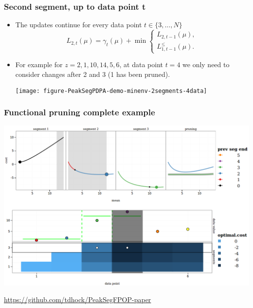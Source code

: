 \documentclass{beamer}
\begin{document}
\begin{frame}
  \frametitle{Second segment, up to data point t}
  \begin{itemize}
  \item The updates continue for every data point $t\in\{3, ..., N\}$
    \begin{equation*}
      L_{2,t}(\mu) =  \gamma_t(\mu) + \min
      \begin{cases}
        L_{2,t-1}(\mu),\\
        L_{1,t-1}^{\leq}(\mu).
      \end{cases}
    \end{equation*}
  \item For example for $z = 2, 1, 10, 14, 5, 6$, at data point $t=4$
    we only need to consider changes after 2 and 3 (1 has been
    pruned).
    \begin{center}
      \texttt{[image: figure-PeakSegPDPA-demo-minenv-2segments-4data]}
    \end{center}
  \end{itemize}
\end{frame}


\begin{frame}
  \frametitle{Functional pruning complete example}
\includegraphics[width=\textwidth]{screenshot-PDPA-demo}

  \url{https://github.com/tdhock/PeakSegFPOP-paper}
\end{frame}
\end{document}
